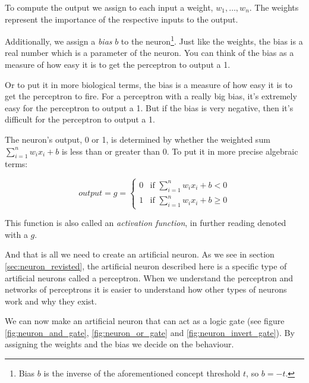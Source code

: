 To compute the output we assign to each input a weight, $w_1, \dots, w_n$. The weights represent the importance of the respective inputs to the output.

Additionally, we assign a \textit{bias} $b$ to the neuron\footnote{Bias $b$ is the inverse of the aforementioned concept threshold $t$, so $b = -t$.}. Just like the weights, the bias is a real number which is a parameter of the neuron. You can think of the bias as a measure of how easy it is to get the perceptron to output a 1.  

Or to put it in more biological terms, the bias is a measure of how easy it is to get the perceptron to fire. For a perceptron with a really big bias, it's extremely easy for the perceptron to output a 1. But if the bias is very negative, then it's difficult for the perceptron to output a 1.

The neuron's output, 0 or 1, is determined by whether the weighted sum $\sum^n_{i=1} w_i x_i + b$ is less than or greater than 0. To put it in more precise algebraic terms:

\begin{equation}
\mathit{output} = g = \left\{\begin{matrix}
 0 & \text{if } \sum\limits_{i=1}^n w_i x_i + b < 0\\
 1 & \text{if } \sum\limits_{i=1}^n w_i x_i + b \geq 0
\end{matrix}\right.
\label{eq:AF_perceptron}
\end{equation}

This function is also called an \textit{activation function}, in further reading denoted with a $g$.

And that is all we need to create an artificial neuron. As we see in section \ref{sec:neuron_revisted}, the artificial neuron described here is a specific type of artificial neurons called a perceptron. When we understand the perceptron and networks of perceptrons it is easier to understand how other types of neurons work and why they exist.

We can now make an artificial neuron that can act as a logic gate (see figure \ref{fig:neuron_and_gate}, \ref{fig:neuron_or_gate} and \ref{fig:neuron_invert_gate}). By assigning the weights and the bias we decide on the behaviour.

